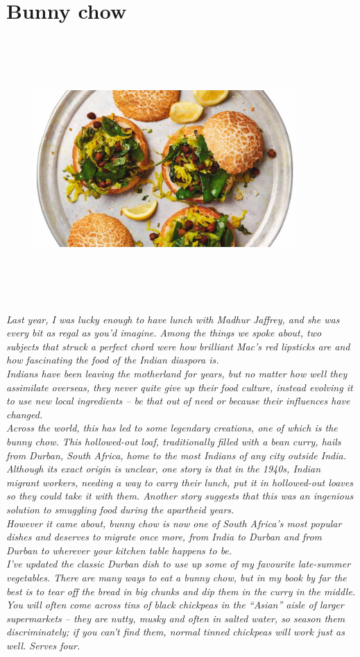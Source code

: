 \documentclass{book}
\begin{document}
\section{Bunny chow}
\begin{figure}
\centering\includegraphics[width=10cm,height=10cm,keepaspectratio]{Recipe_Pictures/Bunny_chow.png}
\end{figure}
\emph{Last year, I was lucky enough to have lunch with Madhur Jaffrey, and she was every bit as regal as you’d imagine. Among the things we spoke about, two subjects that struck a perfect chord were how brilliant Mac’s red lipsticks are and how fascinating the food of the Indian diaspora is.\\ 
Indians have been leaving the motherland for years, but no matter how well they assimilate overseas, they never quite give up their food culture, instead evolving it to use new local ingredients – be that out of need or because their influences have changed.\\ 
Across the world, this has led to some legendary creations, one of which is the bunny chow. This hollowed-out loaf, traditionally filled with a bean curry, hails from Durban, South Africa, home to the most Indians of any city outside India. Although its exact origin is unclear, one story is that in the 1940s, Indian migrant workers, needing a way to carry their lunch, put it in hollowed-out loaves so they could take it with them. Another story suggests that this was an ingenious solution to smuggling food during the apartheid years.\\ 
However it came about, bunny chow is now one of South Africa’s most popular dishes and deserves to migrate once more, from India to Durban and from Durban to wherever your kitchen table happens to be.\\ 
I’ve updated the classic Durban dish to use up some of my favourite late-summer vegetables. There are many ways to eat a bunny chow, but in my book by far the best is to tear off the bread in big chunks and dip them in the curry in the middle. You will often come across tins of black chickpeas in the “Asian” aisle of larger supermarkets – they are nutty, musky and often in salted water, so season them discriminately; if you can’t find them, normal tinned chickpeas will work just as well. Serves four.}\\\\ 
\end{document}
